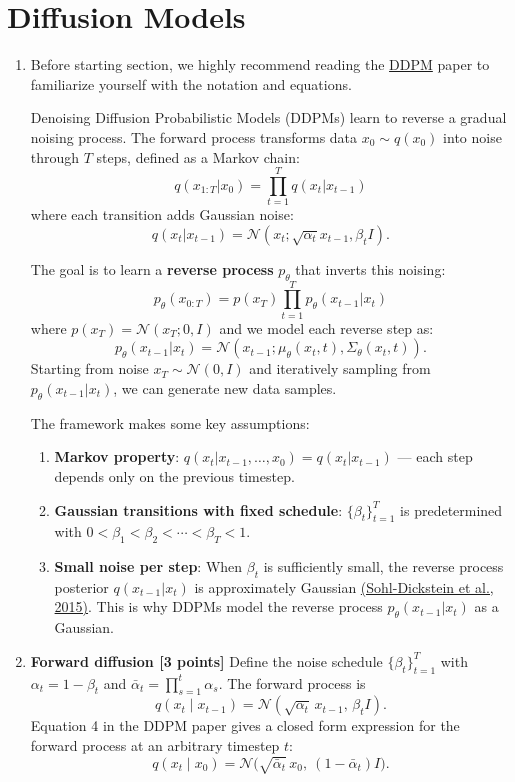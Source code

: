 \documentclass[11pt,english]{article}
\begin{document}
\newpage
\section{Diffusion Models}

\begin{enumerate}
\item
    Before starting section, we highly recommend reading the \href{https://arxiv.org/abs/2006.11239}{DDPM} paper to familiarize yourself with the notation and equations.
    
    Denoising Diffusion Probabilistic Models (DDPMs) learn to reverse a gradual noising process. The forward process transforms data $x_0 \sim q(x_0)$ into noise through $T$ steps, defined as a Markov chain:
    \[
    q(x_{1:T} | x_0) = \prod_{t=1}^T q(x_t | x_{t-1})
    \]
    where each transition adds Gaussian noise:
    \[
    q(x_t | x_{t-1}) = \mathcal{N}(x_t; \sqrt{\alpha_t} x_{t-1}, \beta_t I).
    \]
    
    The goal is to learn a \textbf{reverse process} $p_\theta$ that inverts this noising:
    \[
    p_\theta(x_{0:T}) = p(x_T) \prod_{t=1}^T p_\theta(x_{t-1} | x_t)
    \]
    where $p(x_T) = \mathcal{N}(x_T; 0, I)$ and we model each reverse step as:
    \[
    p_\theta(x_{t-1} | x_t) = \mathcal{N}(x_{t-1}; \mu_\theta(x_t, t), \Sigma_\theta(x_t, t)).
    \]
    Starting from noise $x_T \sim \mathcal{N}(0, I)$ and iteratively sampling from $p_\theta(x_{t-1} | x_t)$, we can generate new data samples.
    
    The framework makes some key assumptions:
    \begin{enumerate}
        \item \textbf{Markov property}: $q(x_t | x_{t-1}, \ldots, x_0) = q(x_t | x_{t-1})$ --- each step depends only on the previous timestep.
        \item \textbf{Gaussian transitions with fixed schedule}: $\{\beta_t\}_{t=1}^T$ is predetermined with $0 < \beta_1 < \beta_2 < \cdots < \beta_T < 1$.
        \item \textbf{Small noise per step}: When $\beta_t$ is sufficiently small, the reverse process posterior $q(x_{t-1} | x_t)$ is approximately Gaussian \href{https://arxiv.org/abs/1503.03585}{(Sohl-Dickstein et al., 2015)}. This is why DDPMs model the reverse process $p_\theta(x_{t-1} | x_t)$ as a Gaussian.
    \end{enumerate}

\item \textbf{Forward diffusion [3 points]}
    Define the noise schedule $\{\beta_t\}_{t=1}^T$ with $\alpha_t=1-\beta_t$ and $\bar\alpha_t=\prod_{s=1}^t \alpha_s$. The forward process is
    \[
    q(x_t\mid x_{t-1})=\mathcal N(\sqrt{\alpha_t}\,x_{t-1},\,\beta_t I).
    \]
    Equation 4 in the DDPM paper gives a closed form expression for the forward process at an arbitrary timestep $t$:
    \[
    q(x_t\mid x_0)=\mathcal N\!\Big(\sqrt{\bar\alpha_t}\,x_0,\ (1-\bar\alpha_t)I\Big).
    \]
    \begin{enumerate}
        

\end{enumerate}
\end{enumerate}
\end{document}
